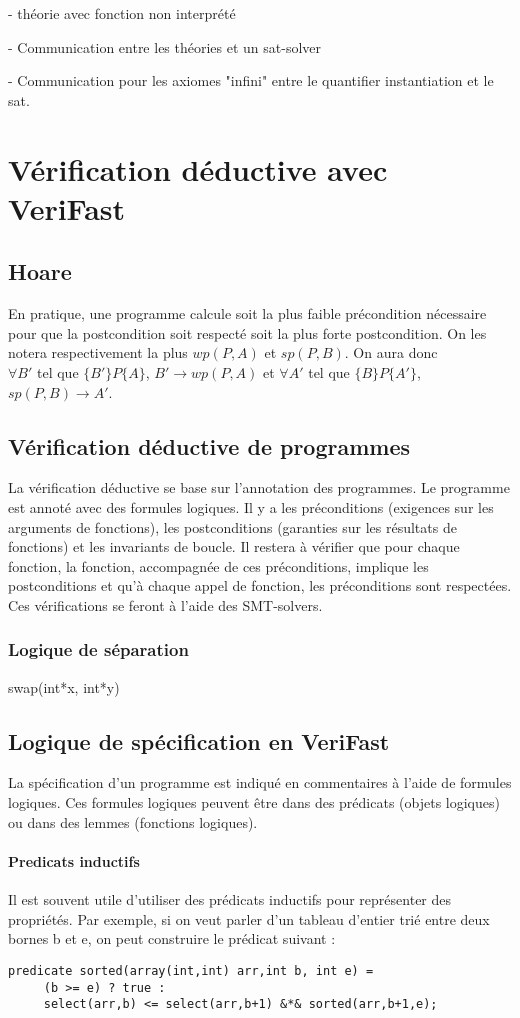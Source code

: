 \documentclass[9pt]{book}
\newcommand{\verifast}{VeriFast}
\begin{document}
 		- th\'eorie avec fonction non interpr\'et\'e \par
 		- Communication entre les th\'eories et un sat-solver \par
 		- Communication pour les axiomes "infini" entre le quantifier instantiation et le sat.

\chapter{V\'erification d\'eductive avec \verifast{}}
	\section{Hoare}
	En pratique, une programme calcule soit la plus faible pr\'econdition n\'ecessaire pour que la postcondition soit respect\'e soit la plus forte postcondition. On les notera respectivement la plus $wp(P,A)$ et $sp(P, B)$. On aura donc \\$\forall B'$ tel que $\{B'\}P\{A\}$, $B' \rightarrow wp(P,A)$ et $\forall A'$ tel que $\{B\}P\{A'\}$, $sp(P,B) \rightarrow A'$. 
	\section{V\'erification d\'eductive de programmes}
		La v\'erification d\'eductive se base sur l'annotation des programmes. Le programme est annot\'e avec des formules logiques. Il y a les pr\'econditions (exigences sur les arguments de fonctions), les postconditions (garanties sur les r\'esultats de fonctions) et les invariants de boucle. Il restera \`a v\'erifier que pour chaque fonction, la fonction, accompagn\'ee de ces pr\'econditions, implique les postconditions et qu'\`a chaque appel de fonction, les pr\'econditions sont respect\'ees. Ces v\'erifications se feront \`a l'aide des SMT-solvers.
		\subsection{Logique de s\'eparation}
			swap(int*x, int*y)
	\section{Logique de sp\'ecification en \verifast{}}
		La sp\'ecification d'un programme est indiqu\'e en commentaires \`a l'aide de formules logiques. Ces formules logiques peuvent \^etre dans des pr\'edicats (objets logiques) ou dans des lemmes (fonctions logiques).
		\subsubsection{Predicats inductifs}
			Il est souvent utile d'utiliser des pr\'edicats inductifs pour repr\'esenter des propri\'et\'es. Par exemple, si on veut parler d'un tableau d'entier tri\'e entre deux bornes b et e, on peut construire le pr\'edicat suivant :
			\begin{lstlisting}
predicate sorted(array(int,int) arr,int b, int e) =
     (b >= e) ? true :
     select(arr,b) <= select(arr,b+1) &*& sorted(arr,b+1,e);
			\end{lstlisting}
\end{document}
